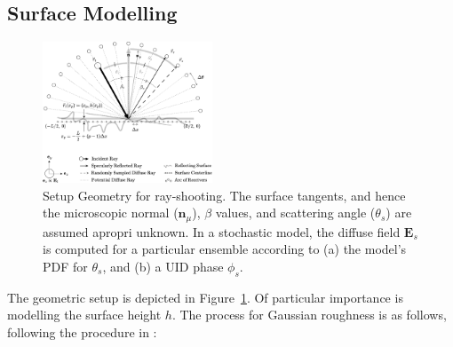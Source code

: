 \documentclass[lettersize,journal]{IEEEtran}
\DeclareRobustCommand{\eFreq}{\mathbf{E}}
\begin{document}
\subsection{Surface Modelling}
\begin{figure}[!t]
   \begin{center}
      \includegraphics[width=0.45\textwidth]{../figures/setup-geometry-crop.pdf}
   \end{center}
   \caption{Setup Geometry for ray-shooting. The surface tangents, and hence the
   microscopic normal ($\mathbf{n}_{\mu}$), $\beta$ values, and scattering angle
   ($\theta_s$) are assumed apropri unknown. In a stochastic model, the diffuse field
   $\eFreq_s$ is computed for a particular ensemble according to (a) the model's PDF
   for $\theta_s$, and (b) a UID phase $\phi_s$.}\label{fig:setup-geometry}
\end{figure}
The geometric setup is depicted in Figure~\ref{fig:setup-geometry}. Of particular
importance is modelling the surface height $h$. The process for Gaussian
roughness is as follows, following the procedure in \cite{ref:surfaceSimFFT}:
\end{document}
